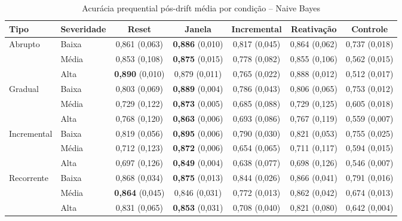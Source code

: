\begin{table}[htbp]
\centering
\small
\caption{Acurácia prequential pós-drift média por condição -- Naive Bayes}
\label{tab:acc-naivebayes}
\begin{adjustbox}{max width=\textwidth}
\begin{tabular}{llccccc}
\toprule
Tipo & Severidade & Reset & Janela & Incremental & Reativação & Controle \\
\midrule
Abrupto & Baixa & 0,861 (0,063) & \textbf{0,886} (0,010) & 0,817 (0,045) & 0,864 (0,062) & 0,737 (0,018) \\
 & Média & 0,853 (0,108) & \textbf{0,875} (0,015) & 0,778 (0,082) & 0,855 (0,106) & 0,562 (0,015) \\
 & Alta & \textbf{0,890} (0,010) & 0,879 (0,011) & 0,765 (0,022) & 0,888 (0,012) & 0,512 (0,017) \\
Gradual & Baixa & 0,803 (0,069) & \textbf{0,889} (0,004) & 0,786 (0,043) & 0,806 (0,065) & 0,753 (0,012) \\
 & Média & 0,729 (0,122) & \textbf{0,873} (0,005) & 0,685 (0,088) & 0,729 (0,125) & 0,605 (0,018) \\
 & Alta & 0,768 (0,120) & \textbf{0,863} (0,006) & 0,693 (0,086) & 0,767 (0,119) & 0,559 (0,007) \\
Incremental & Baixa & 0,819 (0,056) & \textbf{0,895} (0,006) & 0,790 (0,030) & 0,821 (0,053) & 0,755 (0,025) \\
 & Média & 0,712 (0,123) & \textbf{0,872} (0,006) & 0,654 (0,065) & 0,711 (0,117) & 0,594 (0,015) \\
 & Alta & 0,697 (0,126) & \textbf{0,849} (0,004) & 0,638 (0,077) & 0,698 (0,126) & 0,546 (0,007) \\
Recorrente & Baixa & 0,868 (0,034) & \textbf{0,875} (0,013) & 0,844 (0,026) & 0,866 (0,041) & 0,791 (0,016) \\
 & Média & \textbf{0,864} (0,045) & 0,846 (0,031) & 0,772 (0,013) & 0,862 (0,042) & 0,674 (0,013) \\
 & Alta & 0,831 (0,065) & \textbf{0,853} (0,031) & 0,708 (0,040) & 0,821 (0,080) & 0,642 (0,004) \\
\bottomrule
\end{tabular}
\end{adjustbox}
\par\vspace{2pt}{\footnotesize Média e, entre parênteses, desvio-padrão de 10 repetições. Em negrito, a melhor média de cada linha (excluído o controle).}
\end{table}
